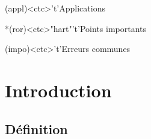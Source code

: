 \documentclass[../../main/main.tex]{subfiles}
\begin{document}
\begin{tcn}[sidebyside, fontupper=\small, fontlower=\small]
	\begin{tcn}(appl)<ctc>'t'{Applications}
	\end{tcn}
	\begin{tcn}*(ror)<ctc>"hart"'t'{Points importants}
	\end{tcn}
	\begin{tcn}(impo)<ctc>'t'{Erreurs communes}
	\end{tcn}
\end{tcn}

\vspace*{\fill}
\newpage

\section{Introduction}
\subsection{Définition}
\end{document}
